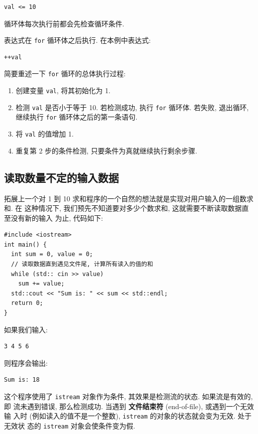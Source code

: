 \documentclass[lang=cn]{elegantbook}
\begin{document}
\begin{verbatim}
val <= 10
\end{verbatim}

循环体每次执行前都会先检查循环条件.

表达式在 \texttt{for} 循环体之后执行. 在本例中表达式:

\begin{verbatim}
++val
\end{verbatim}

简要重述一下 \texttt{for} 循环的总体执行过程:

\begin{enumerate}
\item 创建变量 \texttt{val}, 将其初始化为 1.
\item 检测 \texttt{val} 是否小于等于 10. 若检测成功, 执行 \texttt{for} 循环体. 若失败, 退出循环,
继续执行 \texttt{for} 循环体之后的第一条语句.
\item 将 \texttt{val} 的值增加 1.
\item 重复第 2 步的条件检测, 只要条件为真就继续执行剩余步骤.
\end{enumerate}

\subsection{读取数量不定的输入数据}
\label{sec:org7c71f32}

拓展上一个对 1 到 10 求和程序的一个自然的想法就是实现对用户输入的一组数求和. 在
这种情况下, 我们预先不知道要对多少个数求和, 这就需要不断读取数据直至没有新的输入
为止, 代码如下:

\begin{verbatim}
#include <iostream>
int main() {
  int sum = 0, value = 0;
  // 读取数据直到遇见文件尾, 计算所有读入的值的和
  while (std:: cin >> value)
    sum += value;
  std::cout << "Sum is: " << sum << std::endl;
  return 0;
}
\end{verbatim}

如果我们输入:

\begin{verbatim}
3 4 5 6
\end{verbatim}

则程序会输出:

\begin{verbatim}
Sum is: 18
\end{verbatim}
这个程序使用了 \texttt{istream} 对象作为条件, 其效果是检测流的状态. 如果流是有效的, 即
流未遇到错误, 那么检测成功. 当遇到 \textbf{文件结束符} (end-of-file), 或遇到一个无效输
入时 (例如读入的值不是一个整数), \texttt{istream} 的对象的状态就会变为无效. 处于无效状
态的 \texttt{istream} 对象会使条件变为假.
\end{document}
